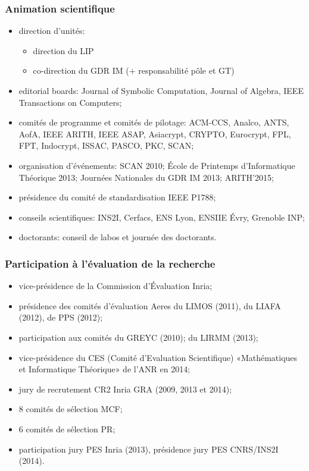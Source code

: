 \documentclass[mathsans]{beamer}
\begin{document}
\begin{frame}
\frametitle{Animation scientifique}
\begin{itemize}
    \item \alert{direction d'unités:} %
    \begin{itemize}
         \item direction du LIP  
         \item co-direction du GDR IM  (+ responsabilité pôle et GT)
    \end{itemize}
    \item \alert{editorial boards:} Journal
 of Symbolic Computation, Journal of Algebra, IEEE Transactions on Computers;
   \item \alert{comités de programme et comités de pilotage:} ACM-CCS, Analco, ANTS, AofA, IEEE ARITH, IEEE ASAP, Asiacrypt, CRYPTO, Eurocrypt, FPL, FPT, Indocrypt, ISSAC, PASCO, PKC, SCAN;
   \item \alert{organisation d'événements:} SCAN 2010; \'Ecole de Printemps d'Informatique Théorique 2013; Journées Nationales du GDR IM 2013;  ARITH'2015;
   \item \alert{présidence} du comité de standardisation  IEEE P1788;
   \item \alert{conseils scientifiques:} INS2I, Cerfacs, ENS Lyon, ENSIIE \'Evry, Grenoble INP;
   \item \alert{doctorants:} conseil de labos et journée des doctorants.
\end{itemize}
\end{frame}

\begin{frame}
\frametitle{Participation à l'évaluation de la recherche}
\begin{itemize}
     \item vice-présidence de la Commission d'\'Evaluation Inria;
     \item présidence des comités d'évaluation Aeres du LIMOS (2011), du LIAFA (2012), de PPS (2012);
     \item participation aux comités  du GREYC (2010); du LIRMM (2013);
     \item vice-présidence du CES (Comité d'Evaluation Scientifique) «Mathématiques et Informatique Théorique» de l'ANR en 2014;
     \item jury de recrutement CR2 Inria GRA (2009, 2013 et 2014);
     \item 8 comités de sélection MCF;
     \item 6 comités de sélection PR;
     \item participation jury PES Inria (2013), présidence jury PES CNRS/INS2I (2014).
 \end{itemize}
\end{frame}
\end{document}
